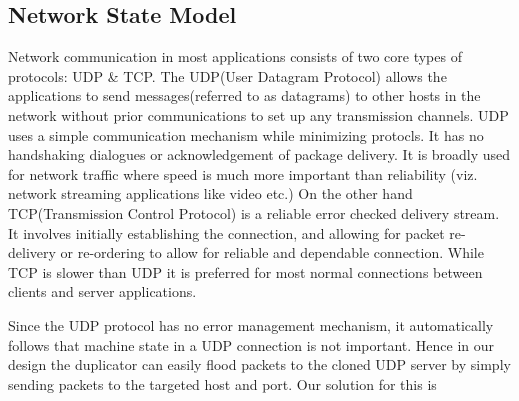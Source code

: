 
\subsection{Network State Model}
\label{sec:networkStateModel}

Network communication in most applications consists of two core types of protocols: UDP \& TCP.
The UDP(User Datagram Protocol) allows the applications to send messages(referred to as datagrams) to other hosts in the network without prior communications to set up any transmission channels.
UDP uses a simple communication mechanism while minimizing protocls. 
It has no handshaking dialogues or acknowledgement of package delivery. It is broadly used for network traffic where speed is much more important than reliability (viz. network streaming applications like video etc.)
On the other hand TCP(Transmission Control Protocol) is a reliable error checked delivery stream.
It involves initially establishing the connection, and allowing for packet re-delivery or re-ordering to allow for reliable and dependable connection. 
While TCP is slower than UDP it is preferred for most normal connections between clients and server applications.

Since the UDP protocol has no error management mechanism, it automatically follows that machine state in a UDP connection is not important.
Hence in our design the duplicator can easily flood packets to the cloned UDP server by simply sending packets to the targeted host and port. 
Our solution for this is 
